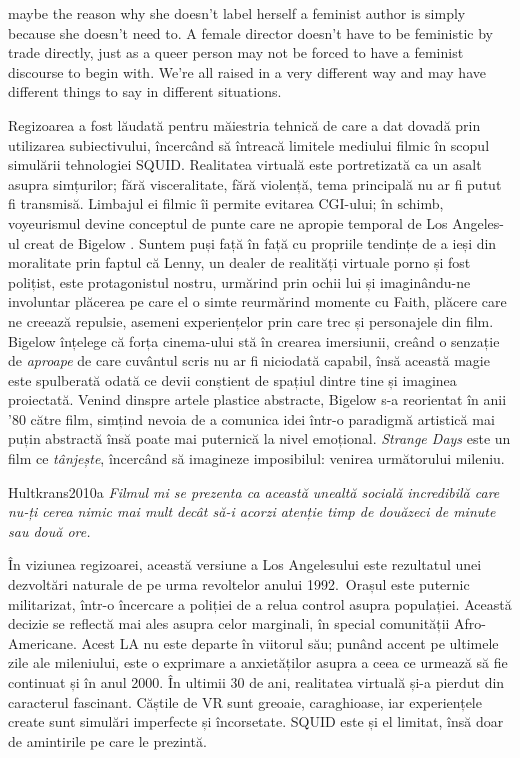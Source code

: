 \documentclass[12pt]{article}
\begin{document}
maybe the reason why she doesn't label herself a feminist author is simply because she doesn't need to. A female director doesn't have to be feministic by trade directly, just as a queer person may not be forced to have a feminist discourse to begin with. We're all raised in a very different way and may have different things to say in different situations. 

Regizoarea a fost lăudată pentru măiestria tehnică de care a dat dovadă prin utilizarea subiectivului, încercând să întreacă limitele mediului filmic în scopul simulării tehnologiei \dedouble SQUID\sqtworight. Realitatea virtuală este portretizată ca un asalt asupra simțurilor; fără visceralitate, fără violență, tema principală nu ar fi putut fi transmisă. Limbajul ei filmic îi permite evitarea CGI-ului; în schimb, voyeurismul devine conceptul de punte care ne apropie temporal de Los Angeles-ul creat de Bigelow \cite{Hultkrans2010a}. Suntem puși față în față cu propriile tendințe de a ieși din moralitate prin faptul că Lenny, un dealer de realități virtuale porno și fost polițist, este protagonistul nostru, urmărind prin ochii lui și imaginându-ne involuntar plăcerea pe care el o simte reurmărind momente cu Faith, plăcere care ne creează repulsie, asemeni experiențelor prin care trec și personajele din film. Bigelow înțelege că forța cinema-ului stă în crearea imersiunii, creând o senzație de \textit{aproape} de care cuvântul scris nu ar fi niciodată capabil, însă această magie este spulberată odată ce devii conștient de spațiul dintre tine și imaginea proiectată. Venind dinspre artele plastice abstracte, Bigelow s-a reorientat în anii '80 către film, simțind nevoia de a comunica idei într-o paradigmă artistică mai puțin abstractă însă poate mai puternică la nivel emoțional. \textit{Strange Days} este un film ce \textit{tânjește}, încercând să imagineze imposibilul: venirea următorului mileniu.\par

\begin{displaycquote}{Hultkrans2010a}
	\textit{Filmul mi se prezenta ca această unealtă socială incredibilă care nu-ți cerea nimic mai mult decât să-i acorzi atenție timp de douăzeci de minute sau două ore.}
\end{displaycquote}

În viziunea regizoarei, această versiune a Los Angelesului este rezultatul unei dezvoltări naturale de pe urma revoltelor anului 1992. Orașul este puternic militarizat, într-o încercare a poliției de a relua control asupra populației. Această decizie se reflectă mai ales asupra celor marginali, în special comunității Afro-Americane. Acest LA nu este departe în viitorul său; punând accent pe ultimele zile ale mileniului, este o exprimare a anxietăților asupra a ceea ce urmează să fie continuat și în anul 2000. În ultimii 30 de ani, realitatea virtuală și-a pierdut din caracterul fascinant. Căștile de VR sunt greoaie, caraghioase, iar experiențele create sunt simulări imperfecte și încorsetate. SQUID este și el limitat, însă doar de amintirile pe care le prezintă.\par
\end{document}
